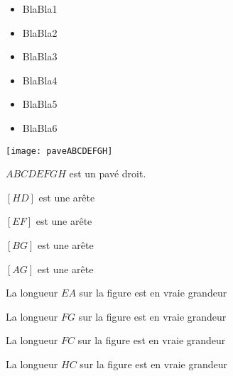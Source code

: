 \begin{acquis}
\begin{itemize}
\item BlaBla1
\item BlaBla2
\item BlaBla3
\item BlaBla4
\item BlaBla5
\item BlaBla6
\end{itemize}
\end{acquis}


\begin{QCM}
  \begin{GroupeQCM}
  
      \begin{center} \texttt{[image: paveABCDEFGH]} \end{center}
      \begin{center} $ABCDEFGH$ est un pavé droit. \end{center}
      
    \begin{exercice}
      \begin{ChoixQCM}{4}
      \item $[HD]$ est une arête
      \item $[EF]$ est une arête
      \item $[BG]$ est une arête
      \item $[AG]$ est une arête
      \end{ChoixQCM}
\begin{corrige}
   \end{corrige}
    \end{exercice}
    
    \begin{exercice}
      \begin{ChoixQCM}{4}
      \item La longueur $EA$  sur la figure est en vraie grandeur
      \item La longueur $FG$  sur la figure est en vraie grandeur
      \item La longueur $FC$  sur la figure est en vraie grandeur
      \item La longueur $HC$  sur la figure est en vraie grandeur
      \end{ChoixQCM}
\begin{corrige}
   \end{corrige}
    \end{exercice}
    

\end{GroupeQCM}
\end{QCM}
